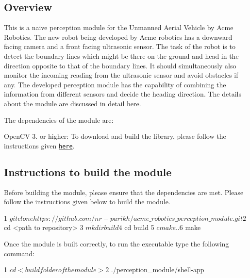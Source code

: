 \href{https://travis-ci.org/nr-parikh/acme_robotics_perception_module}{\tt } \href{https://coveralls.io/github/nr-parikh/acme_robotics_perception_module?branch=master}{\tt } \href{https://github.com/nr-parikh/acme_robotics_perception_module/blob/master/LICENSE}{\tt }

\subsection*{Overview}

This is a naive perception module for the Unmanned Aerial Vehicle by Acme Robotics. The new robot being developed by Acme robotics has a downward facing camera and a front facing ultrasonic sensor. The task of the robot is to detect the boundary lines which might be there on the ground and head in the direction opposite to that of the boundary lines. It should simultaneously also monitor the incoming reading from the ultrasonic sensor and avoid obstacles if any. The developed perception module has the capability of combining the information from different sensors and decide the heading direction. The details about the module are discussed in detail here.

The dependencies of the module are\+:
\begin{DoxyItemize}
\item Open\+CV 3. or higher\+: To download and build the library, please follow the instructions given \href{https://www.learnopencv.com/install-opencv3-on-ubuntu/}{\tt here}.
\end{DoxyItemize}

\subsection*{Instructions to build the module}

Before building the module, please ensure that the dependencies are met. Please follow the instructions given below to build the module.


\begin{DoxyCode}
1 $ git clone https://github.com/nr-parikh/acme\_robotics\_perception\_module.git
2 $ cd <path to repository>
3 $ mkdir build
4 $ cd build
5 $ cmake ..
6 $ make
\end{DoxyCode}


Once the module is built correctly, to run the executable type the following command\+: 
\begin{DoxyCode}
1 $ cd <build folder of the module>
2 $ ./perception\_module/shell-app
\end{DoxyCode}


